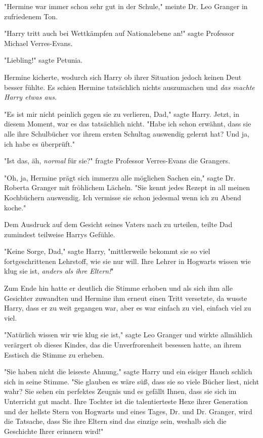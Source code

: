 {"Hermine war immer schon sehr gut in der Schule," meinte Dr. Leo Granger in zufriedenem Ton.

"Harry tritt auch bei Wettkämpfen auf Nationalebene an!" sagte Professor Michael Verres-Evans.

"Liebling!" sagte Petunia.

Hermine kicherte, wodurch sich Harry ob ihrer Situation jedoch keinen Deut besser fühlte. Es schien Hermine tatsächlich nichts auszumachen und \emph{das machte Harry etwas aus.}

"Es ist mir nicht peinlich gegen sie zu verlieren, Dad," sagte Harry. Jetzt, in diesem Moment, war es das tatsächlich nicht. "Habe ich schon erwähnt, dass sie alle ihre Schulbücher vor ihrem ersten Schultag auswendig gelernt hat? Und ja, ich habe es überprüft."

"Ist das, äh, \emph{normal} für sie?" fragte Professor Verres-Evans die Grangers.

"Oh, ja, Hermine prägt sich immerzu alle möglichen Sachen ein," sagte Dr. Roberta Granger mit fröhlichem Lächeln. "Sie kennt jedes Rezept in all meinen Kochbüchern auswendig. Ich vermisse sie schon jedesmal wenn ich zu Abend koche."

Dem Ausdruck auf dem Gesicht seines Vaters nach zu urteilen, teilte Dad zumindest teilweise Harrys Gefühle.

"Keine Sorge, Dad," sagte Harry, "mittlerweile bekommt sie so viel fortgeschrittenen Lehrstoff, wie sie nur will. Ihre Lehrer in Hogwarts wissen wie klug sie ist, \emph{anders als ihre Eltern!}"

Zum Ende hin hatte er deutlich die Stimme erhoben und als sich ihm alle Gesichter zuwandten und Hermine ihm erneut einen Tritt versetzte, da wusste Harry, dass er zu weit gegangen war, aber es war einfach zu viel, einfach viel zu viel.

"Natürlich wissen wir wie klug sie ist," sagte Leo Granger und wirkte allmählich verärgert ob dieses Kindes, das die Unverfrorenheit besessen hatte, an ihrem Esstisch die Stimme zu erheben.

"Sie haben nicht die leiseste Ahnung," sagte Harry und ein eisiger Hauch schlich sich in seine Stimme. "Sie glauben es wäre süß, dass sie so viele Bücher liest, nicht wahr? Sie sehen ein perfektes Zeugnis und es gefällt Ihnen, dass sie sich im Unterricht gut macht. Ihre Tochter ist die talentierteste Hexe ihrer Generation und der hellste Stern von Hogwarts und eines Tages, Dr. und Dr. Granger, wird die Tatsache, dass Sie ihre Eltern sind das einzige sein, weshalb sich die Geschichte Ihrer erinnern wird!"

}
